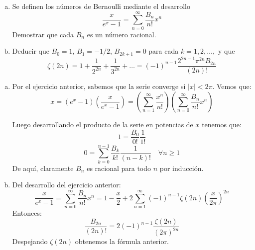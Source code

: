 \documentclass[twoside]{article}
\begin{document}
\newpage
\begin{ejercicio}{6}
\begin{enumerate}[(a)]
	\item Se definen los números de Bernoulli mediante el desarrollo
	\[ \frac{x}{e^x-1} = \sum_{n=0}^{∞} \frac{B_n}{n!}x^n \]
	Demostrar que cada $B_n$ es un número racional.
	\item Deducir que $B_0 = 1$, $B_1 = -1/2$, $B_{2k+1} = 0$ para cada $k=1,2,\dots,$ y que
	\[ ζ(2n) = 1 + \frac{1}{2^{2n}} + \frac{1}{3^{2n}} + \dots = (-1)^{n-1} \frac{2^{2n-1}π^{2n}B_{2n}}{(2n)!} \]
\end{enumerate}
\end{ejercicio}
\begin{solucion}\mbox{}
\begin{enumerate}[(a)]
	\item Por el ejercicio anterior, sabemos que la serie converge si $|x|<2π$. Vemos que:
	\[ x = (e^x-1)\left(\frac{x}{e^x-1}\right) = \left(\sum_{n=1}^{∞} \frac{x^n}{n!}\right)\left(\sum_{n=0}^{∞} \frac{B_n}{n!}x^n\right)\]

Luego desarrollando el producto de la serie en potencias de $x$ tenemos que:
\[ 1 = \frac{B_0}{0!}\frac{1}{1!} \]
\[ 0 = \sum_{k=0}^{n-1} \frac{B_k}{k!} \frac{1}{(n-k)!} \quad \forall n≥1\]
De aquí, claramente $B_n$ es racional para todo $n$ por inducción.

	\item Del desarrollo del ejercicio anterior:
	\[ \frac{x}{e^x-1} = \sum_{n=0}^{∞} \frac{B_n}{n!} x^n = 1-\frac{x}{2} + 2 \sum_{n=1}^{∞} (-1)^{n-1} ζ(2n) \left(\frac{x}{2π}\right)^{2n}\]
	Entonces:
	\[ \frac{B_{2n}}{(2n)!} = 2(-1)^{n-1} \frac{ζ(2n)}{(2π)^{2n}} \]
	Despejando $ζ(2n)$ obtenemos la fórmula anterior.
\end{enumerate}
\end{solucion}
\end{document}
